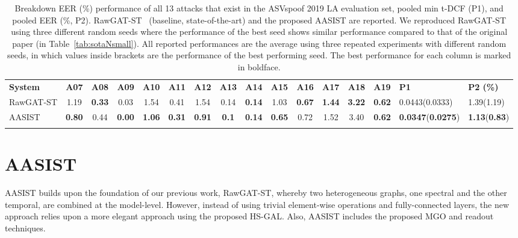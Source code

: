 \documentclass{article}
\begin{document}
\begin{table*}[!t]
    \centering
    \small
    \setlength\tabcolsep{4.5pt}
    \begin{tabularx}{\linewidth}{l || *{13}{c}| YY}
      \Xhline{1pt}
      \textbf{System} &\textbf{A07}&\textbf{A08}&\textbf{A09}&\textbf{A10}&\textbf{A11}&\textbf{A12}&\textbf{A13}&\textbf{A14}&\textbf{A15}&\textbf{A16}&\textbf{A17}&\textbf{A18}&\textbf{A19}& \textbf{P1} & \textbf{P2 (\%)} 	\\ 
      \Xhline{1pt}
      RawGAT-ST &1.19 &\textbf{0.33} &0.03 &1.54 &0.41 &1.54 &0.14 &\textbf{0.14} &1.03 &\textbf{0.67} &\textbf{1.44} &\textbf{3.22} &\textbf{0.62} & 0.0443(0.0333) &1.39(1.19)\\
      \hline
      AASIST & \textbf{0.80} & 0.44 & \textbf{0.00} & \textbf{1.06} & \textbf{0.31} & \textbf{0.91} & \textbf{0.1} & \textbf{0.14} & \textbf{0.65} & 0.72 & 1.52 & 3.40 & \textbf{0.62} & \textbf{0.0347}(\textbf{0.0275})  &\textbf{1.13}(\textbf{0.83})\\

         \Xhline{1pt}
    \end{tabularx}
    \caption{
      Breakdown EER (\%) performance of all 13 attacks that exist in the ASVspoof 2019 LA evaluation set, pooled min t-DCF (P1), and pooled EER (\%, P2).
      RawGAT-ST~\cite{tak2021end} (baseline, state-of-the-art) and the proposed AASIST are reported. 
      We reproduced RawGAT-ST using three different random seeds where the performance of the best seed shows similar performance compared to that of the original paper (in Table~\ref{tab:sotaNsmall}).
      All reported performances are the average using three repeated experiments with different random seeds, in which values inside brackets are the performance of the best performing seed. The best performance for each column is marked in boldface. }
    \vspace{-10pt}
    \label{tab:breakdown}
\end{table*} 
\section{AASIST}
\label{sec:AASIST}
AASIST builds upon the foundation of our previous work, RawGAT-ST, whereby two heterogeneous graphs, one spectral and the other temporal, are combined at the model-level. 
However, instead of using trivial element-wise operations and fully-connected layers, the new approach relies upon a more elegant approach using the proposed HS-GAL. 
Also, AASIST includes the proposed MGO and readout techniques. 
\end{document}
